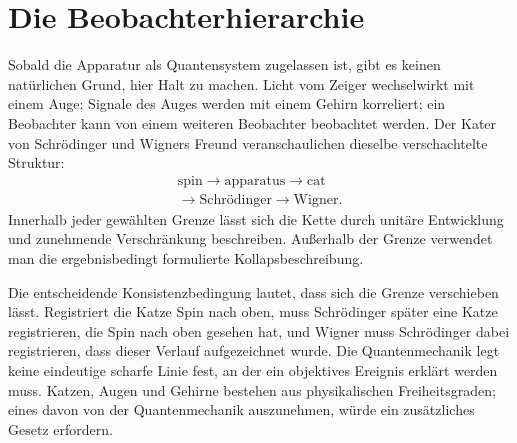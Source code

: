 \begin{classroomqa}
\end{classroomqa}

\begin{classroomqa}
\end{classroomqa}

\section{Die Beobachterhierarchie}

Sobald die Apparatur als Quantensystem zugelassen ist, gibt es keinen natürlichen Grund, hier Halt zu machen. Licht vom Zeiger wechselwirkt mit einem Auge; Signale des Auges werden mit einem Gehirn korreliert; ein Beobachter kann von einem weiteren Beobachter beobachtet werden. Der Kater von Schr\"odinger und Wigners Freund veranschaulichen dieselbe verschachtelte Struktur:
\begin{equation}
\begin{gathered}
\text{spin}
\longrightarrow
\text{apparatus}
\longrightarrow
\text{cat}\\
\longrightarrow
\text{Schr\"odinger}
\longrightarrow
\text{Wigner}.
\end{gathered}
\label{eq:l7-observer-chain}
\end{equation}
Innerhalb jeder gewählten Grenze lässt sich die Kette durch unitäre Entwicklung und zunehmende Verschränkung beschreiben. Außerhalb der Grenze verwendet man die ergebnisbedingt formulierte Kollapsbeschreibung.

Die entscheidende Konsistenzbedingung lautet, dass sich die Grenze verschieben lässt. Registriert die Katze Spin nach oben, muss Schr\"odinger später eine Katze registrieren, die Spin nach oben gesehen hat, und Wigner muss Schr\"odinger dabei registrieren, dass dieser Verlauf aufgezeichnet wurde. Die Quantenmechanik legt keine eindeutige scharfe Linie fest, an der ein objektives Ereignis erklärt werden muss. Katzen, Augen und Gehirne bestehen aus physikalischen Freiheitsgraden; eines davon von der Quantenmechanik auszunehmen, würde ein zusätzliches Gesetz erfordern.

